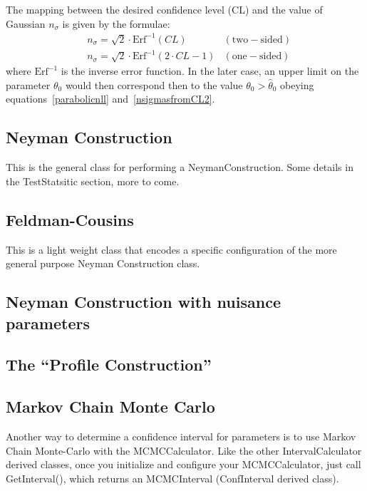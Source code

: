 \documentclass[11pt]{article}
\begin{document}
The mapping between the desired 
confidence level (CL) and the value of Gaussian $n_\sigma$ is given by the formulae:
\begin{eqnarray}
    \label{nsigmasfromCL1}
    &n_\sigma = \sqrt{2}\cdot \mathrm{Erf}^{-1}(CL) & \mathrm{(two-sided)} \\
    &n_\sigma = \sqrt{2}\cdot \mathrm{Erf}^{-1}(2 \cdot CL -1) & \mathrm{(one-sided)}
    \label{nsigmasfromCL2}
\end{eqnarray}
where $\mathrm{Erf}^{-1}$ is the inverse error function. In
the later case, an upper limit on the parameter $\theta_0$ would then
correspond then to the value $\theta_0>\hat{\theta}_0$ obeying
equations~\ref{parabolicnll} and~\ref{nsigmasfromCL2}.



	\subsection{Neyman Construction}

This is the general class for performing a NeymanConstruction.
Some details in the TestStatsitic section, more to come.

	\subsection{Feldman-Cousins}

This is a light weight class that encodes a specific configuration of the more general purpose  Neyman Construction class.

	\subsection{Neyman Construction with nuisance parameters} 

	\subsection{The ``Profile Construction''}

	\subsection{Markov Chain Monte Carlo}

	Another way to determine a confidence interval for parameters is to use Markov Chain Monte-Carlo with the MCMCCalculator.  Like the other IntervalCalculator derived classes, once you initialize and configure your MCMCCalculator, just call GetInterval(), which returns an MCMCInterval (ConfInterval derived class).
	
\end{document}

